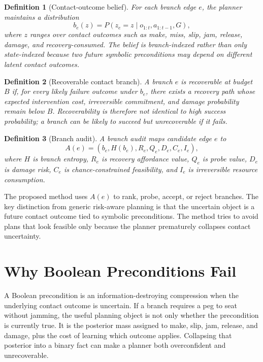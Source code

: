 \documentclass{article}
\newtheorem{definition}{Definition}
\begin{document}
\begin{definition}[Contact-outcome belief]
For each branch edge $e$, the planner maintains a distribution
\[
  b_e(z) = P(z_e=z \mid o_{1:t}, a_{1:t-1}, G),
\]
where $z$ ranges over contact outcomes such as make, miss, slip, jam, release, damage, and recovery-consumed. The belief is branch-indexed rather than only state-indexed because two future symbolic preconditions may depend on different latent contact outcomes.
\end{definition}

\begin{definition}[Recoverable contact branch]
A branch $e$ is recoverable at budget $B$ if, for every likely failure outcome under $b_e$, there exists a recovery path whose expected intervention cost, irreversible commitment, and damage probability remain below $B$. Recoverability is therefore not identical to high success probability; a branch can be likely to succeed but unrecoverable if it fails.
\end{definition}

\begin{definition}[Branch audit]
A branch audit maps candidate edge $e$ to
\[
  A(e)=\left(b_e, H(b_e), R_e, Q_e, D_e, C_e, I_e\right),
\]
where $H$ is branch entropy, $R_e$ is recovery affordance value, $Q_e$ is probe value, $D_e$ is damage risk, $C_e$ is chance-constrained feasibility, and $I_e$ is irreversible resource consumption.
\end{definition}

The proposed method uses $A(e)$ to rank, probe, accept, or reject branches. The key distinction from generic risk-aware planning is that the uncertain object is a future contact outcome tied to symbolic preconditions. The method tries to avoid plans that look feasible only because the planner prematurely collapses contact uncertainty.

\section{Why Boolean Preconditions Fail}
A Boolean precondition is an information-destroying compression when the underlying contact outcome is uncertain. If a branch requires a peg to seat without jamming, the useful planning object is not only whether the precondition is currently true. It is the posterior mass assigned to make, slip, jam, release, and damage, plus the cost of learning which outcome applies. Collapsing that posterior into a binary fact can make a planner both overconfident and unrecoverable.
\end{document}
